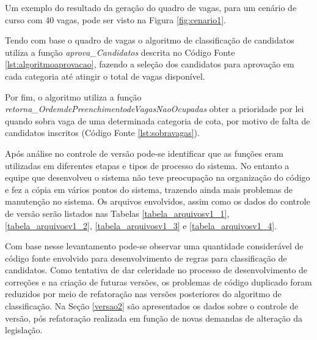 Um exemplo do resultado da geração do quadro de vagas, para um cenário de curso com 40 vagas,  pode ser visto na Figura \ref{fig:cenario1}.



\newpage
Tendo com base o quadro de vagas o algoritmo de classificação de candidatos utiliza a função \textit{aprova\_Candidatos} descrita no Código Fonte \ref{lst:algoritmoaprovacao}, fazendo a seleção dos candidatos para aprovação em cada categoria até atingir o total de vagas disponível. 



Por fim, o algoritmo utiliza a função \textit{retorna\_OrdemdePreenchimentodeVagasNaoOcupadas} obter a prioridade por lei quando sobra vaga de uma determinada categoria de cota, por motivo de falta de candidatos inscritos (Código Fonte \ref{lst:sobravagas}).



Após análise no controle de versão pode-se identificar que as funções eram utilizadas em diferentes etapas e tipos de processo do sistema. No entanto a equipe que desenvolveu o sistema não teve preocupação na organização do código e fez a cópia em vários pontos do sistema, trazendo ainda mais problemas de manutenção no sistema. Os arquivos envolvidos, assim como os dados do controle de versão serão listados nas Tabelas \ref{tabela_arquivosv1_1}, \ref{tabela_arquivosv1_2}, \ref{tabela_arquivosv1_3} e \ref{tabela_arquivosv1_4}.



\newpage
Com base nesse levantamento pode-se observar uma quantidade considerável de código fonte envolvido para desenvolvimento de regras para classificação de candidatos. Como tentativa de dar celeridade no processo de desenvolvimento de correções e na criação de futuras versões, os problemas de código duplicado foram reduzidos por meio de refatoração nas versões posteriores do algoritmo de classificação. Na Seção \ref{versao2} são apresentados os dados sobre o controle de versão, pós refatoração realizada em função de novas demandas de alteração da legislação.
